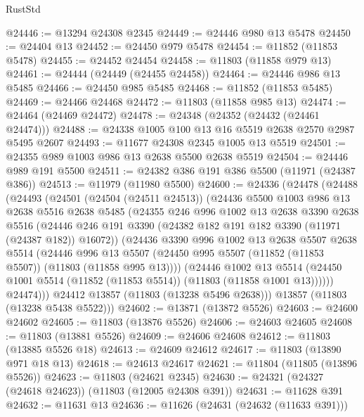 \begin{lexlean}{RustStd}
\begin{coremodule}
@24446 := @13294 @24308 @2345
@24449 := @24446 @980 @13 @5478
@24450 := @24404 @13
@24452 := @24450 @979 @5478
@24454 := @11852 (@11853 @5478)
@24455 := @24452 @24454
@24458 := @11803 (@11858 @979 @13)
@24461 := @24444 (@24449 (@24455 @24458))
@24464 := @24446 @986 @13 @5485
@24466 := @24450 @985 @5485
@24468 := @11852 (@11853 @5485)
@24469 := @24466 @24468
@24472 := @11803 (@11858 @985 @13)
@24474 := @24464 (@24469 @24472)
@24478 := @24348 (@24352 (@24432 (@24461 @24474)))
@24488 := @24338 @1005 @100 @13 @16 @5519 @2638 @2570 @2987 @5495 @2607
@24493 := @11677 @24308 @2345 @1005 @13 @5519
@24501 := @24355 @989 @1003 @986 @13 @2638 @5500 @2638 @5519
@24504 := @24446 @989 @191 @5500
@24511 := @24382 @386 @191 @386 @5500 (@11971 (@24387 @386))
@24513 := @11979 (@11980 @5500)
@24600 := @24336
    (@24478
      (@24488
        (@24493
          (@24501
            (@24504 (@24511 @24513))
            (@24436
              @5500
              @1003
              @986
              @13
              @2638
              @5516
              @2638
              @5485
              (@24355
                @246
                @996
                @1002
                @13
                @2638
                @3390
                @2638
                @5516
                (@24446 @246 @191 @3390 (@24382 @182 @191 @182 @3390 (@11971 (@24387 @182)) @16072))
                (@24436
                  @3390
                  @996
                  @1002
                  @13
                  @2638
                  @5507
                  @2638
                  @5514
                  (@24446
                    @996
                    @13
                    @5507
                    (@24450 @995 @5507 (@11852 (@11853 @5507)) (@11803 (@11858 @995 @13))))
                  (@24446
                    @1002
                    @13
                    @5514
                    (@24450 @1001 @5514 (@11852 (@11853 @5514)) (@11803 (@11858 @1001 @13))))))
              @24474)))
        @24412
        @13857
        (@11803 (@13238 @5496 @2638)))
      @13857
      (@11803 (@13238 @5438 @5522)))
@24602 := @13871 (@13872 @5526)
@24603 := @24600 @24602
@24605 := @11803 (@13876 @5526)
@24606 := @24603 @24605
@24608 := @11803 (@13881 @5526)
@24609 := @24606 @24608
@24612 := @11803 (@13885 @5526 @18)
@24613 := @24609 @24612
@24617 := @11803 (@13890 @971 @18 @13)
@24618 := @24613 @24617
@24621 := @11804 (@11805 (@13896 @5526))
@24623 := @11803 (@24621 @2345)
@24630 := @24321 (@24327 (@24618 @24623)) (@11803 (@12005 @24308 @391))
@24631 := @11628 @391
@24632 := @11631 @13
@24636 := @11626 (@24631 (@24632 (@11633 @391)))

\end{coremodule}
\end{lexlean}

